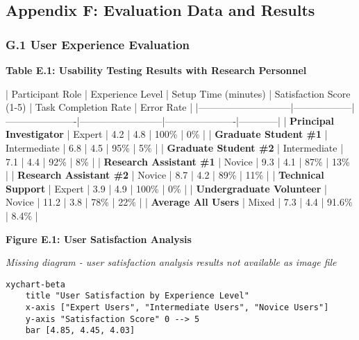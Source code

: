\documentclass[12pt,a4paper]{article}
\begin{document}
\subsection{Appendix F: Evaluation Data and Results}

\subsubsection{G.1 User Experience Evaluation}

\textbf{Table E.1: Usability Testing Results with Research Personnel}

| Participant Role            | Experience Level | Setup Time (minutes) | Satisfaction Score (1-5) | Task Completion Rate | Error Rate |
|-----------------------------|------------------|----------------------|--------------------------|----------------------|------------|
| \textbf{Principal Investigator}  | Expert           | 4.2                  | 4.8                      | 100\%                 | 0\%         |
| \textbf{Graduate Student \#1}     | Intermediate     | 6.8                  | 4.5                      | 95\%                  | 5\%         |
| \textbf{Graduate Student \#2}     | Intermediate     | 7.1                  | 4.4                      | 92\%                  | 8\%         |
| \textbf{Research Assistant \#1}   | Novice           | 9.3                  | 4.1                      | 87\%                  | 13\%        |
| \textbf{Research Assistant \#2}   | Novice           | 8.7                  | 4.2                      | 89\%                  | 11\%        |
| \textbf{Technical Support}       | Expert           | 3.9                  | 4.9                      | 100\%                 | 0\%         |
| \textbf{Undergraduate Volunteer} | Novice           | 11.2                 | 3.8                      | 78\%                  | 22\%        |
| \textbf{Average All Users}       | Mixed            | 7.3                  | 4.4                      | 91.6\%                | 8.4\%       |

\textbf{Figure E.1: User Satisfaction Analysis}

\textit{Missing diagram - user satisfaction analysis results not available as image file}

\begin{verbatim}
xychart-beta
    title "User Satisfaction by Experience Level"
    x-axis ["Expert Users", "Intermediate Users", "Novice Users"]
    y-axis "Satisfaction Score" 0 --> 5
    bar [4.85, 4.45, 4.03]
\end{verbatim}
\end{document}
